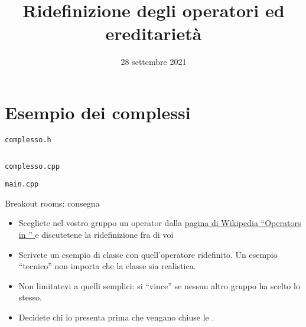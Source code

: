 \documentclass[xcolor={dvipsnames, svgnames, x11names, table}, 10pt]{beamer}
\title{Ridefinizione degli operatori ed ereditarietà}
\date{28 settembre 2021}
\institute{%
    \textbf{Obiettivi di apprendimento}:
    \begin{itemize}
        \item test;
        \item test.
    \end{itemize}%
}
\begin{document}
\frame{\titlepage}

\Sommario

\section{Esempio dei complessi}

\begin{frame}[fragile]{\texttt{complesso.h}}

\begin{columns}
    \column{\dimexpr\paperwidth-30pt}
\end{columns}
\vspace*{\fill}

\end{frame}

\begin{frame}[fragile]{\texttt{complesso.cpp}}


\end{frame}

\begin{frame}[fragile]{\texttt{main.cpp}}


\end{frame}

\begin{frame}{Breakout rooms: consegna}
    \begin{itemize}
        \item Scegliete nel vostro gruppo un operator dalla \href{https://en.wikipedia.org/wiki/Operators\_in\_C\_and\_C\%2B\%2B}{pagina di Wikipedia \enquote{Operators in \cplusplus} \ExternalLink} e discutetene la ridefinizione fra di voi
        \item Scrivete un esempio di classe con quell'operatore ridefinito. Un esempio \enquote{tecnico} non importa che la classe sia realistica.
        \item Non limitatevi a quelli semplici: si \enquote{vince} se nessun altro gruppo ha scelto lo stesso.
        \item Decidete chi lo presenta prima che vengano chiuse le .
    \end{itemize}
\end{frame}
\end{document}
